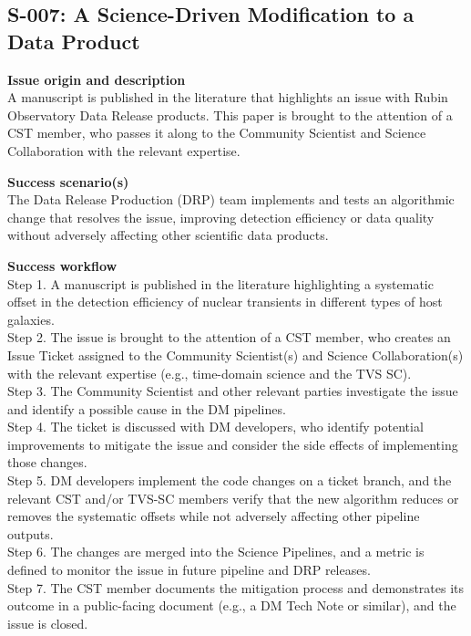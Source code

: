 \subsection{S-007: A Science-Driven Modification to a Data Product}

\textbf{Issue origin and description} \\
A manuscript is published in the literature that highlights an issue with Rubin Observatory Data Release products.
This paper is brought to the attention of a CST member, who passes it along to the Community Scientist and Science Collaboration with the relevant expertise.

\textbf{Success scenario(s)} \\
The Data Release Production (DRP) team implements and tests an algorithmic change that resolves the issue, improving detection efficiency or data quality without adversely affecting other scientific data products.

\textbf{Success workflow} \\
Step 1. A manuscript is published in the literature highlighting a systematic offset in the detection efficiency of nuclear transients in different types of host galaxies. \\
Step 2. The issue is brought to the attention of a CST member, who creates an Issue Ticket assigned to the Community Scientist(s) and Science Collaboration(s) with the relevant expertise (e.g., time-domain science and the TVS SC). \\
Step 3. The Community Scientist and other relevant parties investigate the issue and identify a possible cause in the DM pipelines. \\
Step 4. The ticket is discussed with DM developers, who identify potential improvements to mitigate the issue and consider the side effects of implementing those changes. \\
Step 5. DM developers implement the code changes on a ticket branch, and the relevant CST and/or TVS-SC members verify that the new algorithm reduces or removes the systematic offsets while not adversely affecting other pipeline outputs. \\
Step 6. The changes are merged into the Science Pipelines, and a metric is defined to monitor the issue in future pipeline and DRP releases. \\
Step 7. The CST member documents the mitigation process and demonstrates its outcome in a public-facing document (e.g., a DM Tech Note or similar), and the issue is closed.

